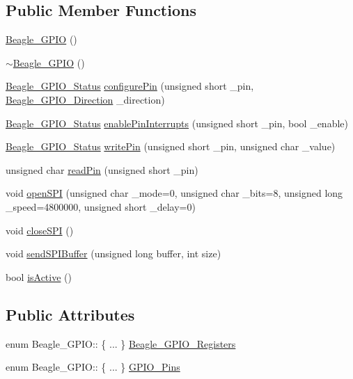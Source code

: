 \subsection*{\-Public \-Member \-Functions}
\begin{DoxyCompactItemize}
\item 
\hyperlink{class_beagle___g_p_i_o_a9d59bb015cf2fd0643905cdf3f265efe}{\-Beagle\-\_\-\-G\-P\-I\-O} ()
\item 
\hyperlink{class_beagle___g_p_i_o_a602473a6b993564cd7adbb9c9d09695c}{$\sim$\-Beagle\-\_\-\-G\-P\-I\-O} ()
\item 
\hyperlink{class_beagle___g_p_i_o_a40ebd672d74de41bbf5944109e1302ee}{\-Beagle\-\_\-\-G\-P\-I\-O\-\_\-\-Status} \hyperlink{class_beagle___g_p_i_o_abdcefa3029c653b16bdf11075601b1fa}{configure\-Pin} (unsigned short \-\_\-pin, \hyperlink{class_beagle___g_p_i_o_abf8efba9f6a4f6b552d1c15c99100765}{\-Beagle\-\_\-\-G\-P\-I\-O\-\_\-\-Direction} \-\_\-direction)
\item 
\hyperlink{class_beagle___g_p_i_o_a40ebd672d74de41bbf5944109e1302ee}{\-Beagle\-\_\-\-G\-P\-I\-O\-\_\-\-Status} \hyperlink{class_beagle___g_p_i_o_a7b67e50e7cc1dfa3a5be88d6c4ed8229}{enable\-Pin\-Interrupts} (unsigned short \-\_\-pin, bool \-\_\-enable)
\item 
\hyperlink{class_beagle___g_p_i_o_a40ebd672d74de41bbf5944109e1302ee}{\-Beagle\-\_\-\-G\-P\-I\-O\-\_\-\-Status} \hyperlink{class_beagle___g_p_i_o_a33d763b486233269f5e8045b69d9ec49}{write\-Pin} (unsigned short \-\_\-pin, unsigned char \-\_\-value)
\item 
unsigned char \hyperlink{class_beagle___g_p_i_o_a698b1f9ef0e609f1b28d823a7d01a8d6}{read\-Pin} (unsigned short \-\_\-pin)
\item 
void \hyperlink{class_beagle___g_p_i_o_a661c40e472c9e7795cc92718ad4b2d30}{open\-S\-P\-I} (unsigned char \-\_\-mode=0, unsigned char \-\_\-bits=8, unsigned long \-\_\-speed=4800000, unsigned short \-\_\-delay=0)
\item 
void \hyperlink{class_beagle___g_p_i_o_a747aaea28330bc339002e43f0e04bb0c}{close\-S\-P\-I} ()
\item 
void \hyperlink{class_beagle___g_p_i_o_a74e936b8da8c28a39a44707317059a01}{send\-S\-P\-I\-Buffer} (unsigned long buffer, int size)
\item 
bool \hyperlink{class_beagle___g_p_i_o_a7a5bcd9a30ae1564f59c94a5c5887b32}{is\-Active} ()
\end{DoxyCompactItemize}
\subsection*{\-Public \-Attributes}
\begin{DoxyCompactItemize}
\item 
enum \-Beagle\-\_\-\-G\-P\-I\-O\-:: \{ ... \}  \hyperlink{class_beagle___g_p_i_o_a9f75d6e93d767194192f573ded387976}{\-Beagle\-\_\-\-G\-P\-I\-O\-\_\-\-Registers}
\item 
enum \-Beagle\-\_\-\-G\-P\-I\-O\-:: \{ ... \}  \hyperlink{class_beagle___g_p_i_o_aa33c6977896ab86e6b493646fcf6c3eb}{\-G\-P\-I\-O\-\_\-\-Pins}
\end{DoxyCompactItemize}
